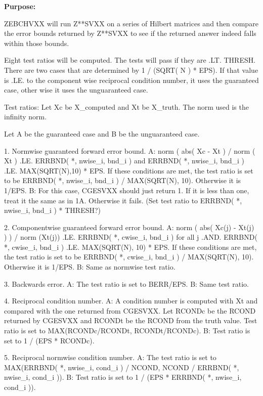 {\bfseries Purpose\+:} \begin{DoxyVerb}  ZEBCHVXX will run Z**SVXX on a series of Hilbert matrices and then
  compare the error bounds returned by Z**SVXX to see if the returned
  answer indeed falls within those bounds.

  Eight test ratios will be computed.  The tests will pass if they are .LT.
  THRESH.  There are two cases that are determined by 1 / (SQRT( N ) * EPS).
  If that value is .LE. to the component wise reciprocal condition number,
  it uses the guaranteed case, other wise it uses the unguaranteed case.

  Test ratios:
     Let Xc be X_computed and Xt be X_truth.
     The norm used is the infinity norm.

     Let A be the guaranteed case and B be the unguaranteed case.

       1. Normwise guaranteed forward error bound.
       A: norm ( abs( Xc - Xt ) / norm ( Xt ) .LE. ERRBND( *, nwise_i, bnd_i ) and
          ERRBND( *, nwise_i, bnd_i ) .LE. MAX(SQRT(N),10) * EPS.
          If these conditions are met, the test ratio is set to be
          ERRBND( *, nwise_i, bnd_i ) / MAX(SQRT(N), 10).  Otherwise it is 1/EPS.
       B: For this case, CGESVXX should just return 1.  If it is less than
          one, treat it the same as in 1A.  Otherwise it fails. (Set test
          ratio to ERRBND( *, nwise_i, bnd_i ) * THRESH?)

       2. Componentwise guaranteed forward error bound.
       A: norm ( abs( Xc(j) - Xt(j) ) ) / norm (Xt(j)) .LE. ERRBND( *, cwise_i, bnd_i )
          for all j .AND. ERRBND( *, cwise_i, bnd_i ) .LE. MAX(SQRT(N), 10) * EPS.
          If these conditions are met, the test ratio is set to be
          ERRBND( *, cwise_i, bnd_i ) / MAX(SQRT(N), 10).  Otherwise it is 1/EPS.
       B: Same as normwise test ratio.

       3. Backwards error.
       A: The test ratio is set to BERR/EPS.
       B: Same test ratio.

       4. Reciprocal condition number.
       A: A condition number is computed with Xt and compared with the one
          returned from CGESVXX.  Let RCONDc be the RCOND returned by CGESVXX
          and RCONDt be the RCOND from the truth value.  Test ratio is set to
          MAX(RCONDc/RCONDt, RCONDt/RCONDc).
       B: Test ratio is set to 1 / (EPS * RCONDc).

       5. Reciprocal normwise condition number.
       A: The test ratio is set to
          MAX(ERRBND( *, nwise_i, cond_i ) / NCOND, NCOND / ERRBND( *, nwise_i, cond_i )).
       B: Test ratio is set to 1 / (EPS * ERRBND( *, nwise_i, cond_i )).


\end{DoxyVerb}
